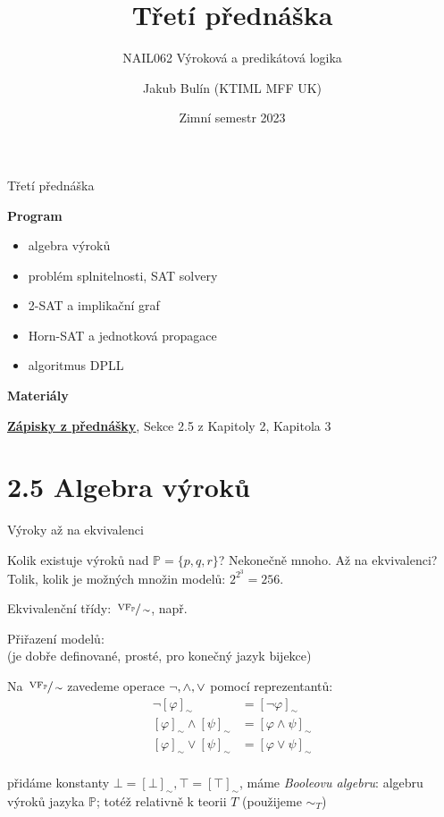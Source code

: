 \documentclass{beamer}
\title{Třetí přednáška}
\subtitle{NAIL062 Výroková a predikátová logika}
\author{Jakub Bulín (KTIML MFF UK)}
\date{Zimní semestr 2023}
\begin{document}
\frame{\titlepage}


\begin{frame}{Třetí přednáška}

    \textbf{Program}
        \begin{itemize}
            \item algebra výroků
            \item problém splnitelnosti, SAT solvery
            \item 2-SAT a implikační graf
            \item Horn-SAT a jednotková propagace
            \item algoritmus DPLL
        \end{itemize}

    \textbf{Materiály}

        \href{https://github.com/jbulin-mff-uk/nail062/raw/main/lecture/lecture-notes/lecture-notes.pdf}{\alert{\textbf{Zápisky z přednášky}}}, Sekce 2.5 z Kapitoly 2, Kapitola 3

\end{frame}


\section{2.5 Algebra výroků}


\begin{frame}{Výroky až na ekvivalenci}

    Kolik existuje výroků nad $\mathbb P=\{p,q,r\}$? Nekonečně mnoho. \alert{Až na ekvivalenci?} Tolik, kolik je možných množin modelů: $2^{2^3}=256$.


    Ekvivalenční třídy: \alert{$\sfrac{\operatorname{VF}_\mathbb P}{\sim}$}, např. 

    Přiřazení modelů: \\        
    (je dobře definované, prosté, pro konečný jazyk bijekce)

    Na $\sfrac{\operatorname{VF}_\mathbb P}{\sim}$ zavedeme operace $\neg,{\land},{\lor}$ \alert{pomocí reprezentantů}:
    {\small
    \begin{align*}
        \neg [\varphi]_\sim &=[\neg\varphi]_\sim\\
        [\varphi]_\sim \land [\psi]_\sim &= [\varphi\land\psi]_\sim\\
        [\varphi]_\sim \lor [\psi]_\sim &= [\varphi\lor\psi]_\sim\\
    \end{align*}
    }

    \vspace{-18pt}
    přidáme konstanty {\small $\bot=[\bot]_\sim,\top=[\top]_\sim$}, máme \emph{Booleovu algebru}: \alert{algebru výroků} jazyka $\mathbb P$; totéž relativně k teorii $T$ (\alert{použijeme $\sim_T$})

\end{frame}
\end{document}
